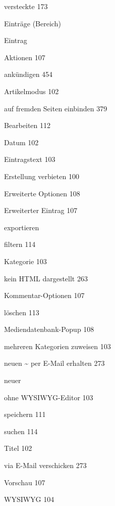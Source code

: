 \documentclass{book}
\renewcommand\subitem{\par}
\begin{document}
\begin{multicols}{2}
\begin{osp-index}
    \subitem versteckte\hspace{1mm} 173
  \item Eintr\"age (Bereich)\hspace{1mm} 
  \item Eintrag
    \subitem Aktionen\hspace{1mm} 107
    \subitem ank\"undigen\hspace{1mm} 454
    \subitem Artikelmodus\hspace{1mm} 102
    \subitem auf fremden Seiten einbinden\hspace{1mm} 379
    \subitem Bearbeiten\hspace{1mm} 112
    \subitem Datum\hspace{1mm} 102
    \subitem Eintragstext\hspace{1mm} 103
    \subitem Erstellung verbieten\hspace{1mm} 100
    \subitem Erweiterte Optionen\hspace{1mm} 108
    \subitem Erweiterter Eintrag\hspace{1mm} 107
    \subitem exportieren\hspace{1mm} 
    \subitem filtern\hspace{1mm} 114
    \subitem Kategorie\hspace{1mm} 103
    \subitem kein HTML dargestellt\hspace{1mm} 263
    \subitem Kommentar-Optionen\hspace{1mm} 107
    \subitem l\"oschen\hspace{1mm} 113
    \subitem Mediendatenbank-Popup\hspace{1mm} 108
    \subitem mehreren Kategorien zuweisen\hspace{1mm} 103
    \subitem neuen \textasciitilde{} per E-Mail erhalten\hspace{1mm} 
		273
    \subitem neuer\hspace{1mm} 
    \subitem ohne WYSIWYG-Editor\hspace{1mm} 103
    \subitem speichern\hspace{1mm} 111
    \subitem suchen\hspace{1mm} 114
    \subitem Titel\hspace{1mm} 102
    \subitem via E-Mail verschicken\hspace{1mm} 273
    \subitem Vorschau\hspace{1mm} 107
    \subitem WYSIWYG\hspace{1mm} 104

\end{osp-index}
\end{multicols}
\end{document}
